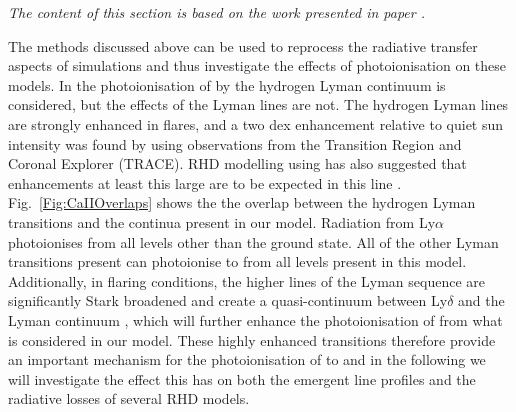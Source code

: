 \emph{The content of this section is based on the work presented in \Caii{} paper \NeedRef{}.}

The methods discussed above can be used to reprocess the radiative transfer aspects of \Radyn{} simulations and thus investigate the effects of \Caii{} photoionisation on these models.
In \Radyn{} the photoionisation of \Caii{} by the hydrogen Lyman continuum is considered, but the effects of the Lyman lines are not.
The hydrogen Lyman lines are strongly enhanced in flares, and a two dex enhancement relative to quiet sun intensity was found by \citet{RubioDaCosta2009} using observations from the Transition Region and Coronal Explorer (TRACE).
RHD modelling using \Radyn{} has also suggested that enhancements at least this large are to be expected in this line \citep{Brown2018, Hong2019}.
Fig.~\ref{Fig:CaIIOverlaps} shows the the overlap between the hydrogen Lyman transitions and the \Caii{} continua present in our model.
Radiation from Ly$\alpha$ photoionises \Caii{} from all levels other than the ground state.
All of the other Lyman transitions present can photoionise \Caii{} to \Caiii{} from all levels present in this model.
Additionally, in flaring conditions, the higher lines of the Lyman sequence are significantly Stark broadened and create a quasi-continuum between Ly$\delta$ and the Lyman continuum \citep{DeFeiter1975}, which will further enhance the photoionisation of \Caii{} from what is considered in our model.
These highly enhanced transitions therefore provide an important mechanism for the photoionisation of \Caii{} to \Caiii{} and in the following we will investigate the effect this has on both the emergent line profiles and the radiative losses of several RHD models.

